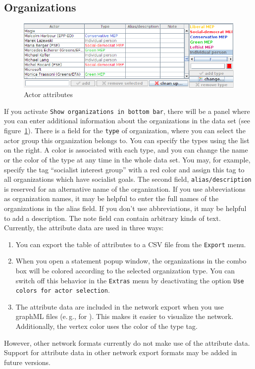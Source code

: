 \documentclass[12pt,a4paper]{scrreprt}
\newcommand{\visone}
{\textsf%
 {\protect\raisebox{.5ex}{\color[rgb]{0.1,0.1,0.1}v}%
  \protect\raisebox{.1ex}{\color[rgb]{0.3,0.3,0.3}i}%
  \protect\raisebox{-.1ex}{\color[rgb]{0.1,0.1,0.1}s}%
  \protect\raisebox{.1ex}{\color[rgb]{0.3,0.3,0.3}o}%
  \protect\raisebox{-.1ex}{\color[rgb]{0.1,0.1,0.1}n}%
  \protect\raisebox{-.4ex}{\color[rgb]{0.3,0.3,0.3}e}%
 }%
}
\newcommand{\code}[1]{\texttt{#1}}
\begin{document}
\subsection{Organizations}
\begin{figure}
 \centering
 \includegraphics[scale=0.4]{dna-attributes.png}
 \caption{Actor attributes}
 \label{dna-attributes}
\end{figure}
If you activate \code{Show organizations in bottom bar}, there will be a panel where you can enter additional information about the organizations in the data set (see figure~\ref{dna-attributes}). There is a field for the \code{type} of organization, where you can select the actor group this organization belongs to. You can specify the types using the list on the right. A color is associated with each type, and you can change the name or the color of the type at any time in the whole data set. You may, for example, specify the tag ``socialist interest group'' with a red color and assign this tag to all organizations which have socialist goals. The second field, \code{alias/description} is reserved for an alternative name of the organization. If you use abbreviations as organization names, it may be helpful to enter the full names of the organizations in the alias field. If you don't use abbreviations, it may be helpful to add a description. The note field can contain arbitrary kinds of text. Currently, the attribute data are used in three ways:
\begin{enumerate}
 \item You can export the table of attributes to a CSV file from the \code{Export} menu.
 \item When you open a statement popup window, the organizations in the combo box will be colored according to the selected organization type. You can switch off this behavior in the \code{Extras} menu by deactivating the option \code{Use colors for actor selection}.
 \item The attribute data are included in the network export when you use graphML files (e.\,g., for \visone). This makes it easier to visualize the network. Additionally, the vertex color uses the color of the type tag.
\end{enumerate}
However, other network formats currently do not make use of the attribute data. Support for attribute data in other network export formats may be added in future versions.
\end{document}
